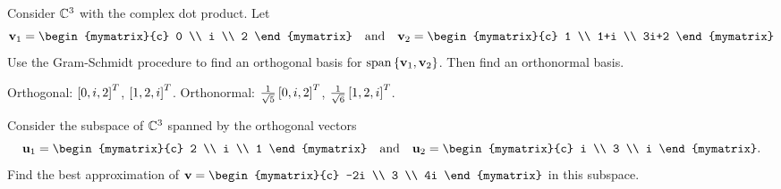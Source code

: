 \begin{ex}
  Consider $\mathbb{C}^3$ with the complex dot product. Let
  \begin{equation*}
    \vect{v}_1 = \begin{mymatrix}{c} 0 \\ i \\ 2 \end{mymatrix}
    \quad\mbox{and}\quad
    \vect{v}_2 = \begin{mymatrix}{c} 1 \\ 1+i \\ 3i+2  \end{mymatrix}
  \end{equation*}
  Use the Gram-Schmidt procedure to find an orthogonal basis for
  $\sspan\set{\vect{v}_1,\vect{v}_2}$. Then find an orthonormal basis.
  \begin{sol}
    Orthogonal: $\left[0,i,2\right]^T$, $\left[1,2,i\right]^T$. Orthonormal:
    $\frac{1}{\sqrt{5}}\left[0,i,2\right]^T$, $\frac{1}{\sqrt{6}}\left[1,2,i\right]^T$.
  \end{sol}
\end{ex}

\begin{ex}
  Consider the subspace of $\mathbb{C}^3$ spanned by the orthogonal vectors
  \begin{equation*}
    \vect{u}_1 = \begin{mymatrix}{c} 2 \\ i \\ 1 \end{mymatrix}
    \quad\mbox{and}\quad
    \vect{u}_2 = \begin{mymatrix}{c} i \\ 3 \\ i \end{mymatrix}.
  \end{equation*}
  Find the best approximation of
  $\vect{v}=\begin{mymatrix}{c} -2i \\ 3 \\ 4i \end{mymatrix}$ in this
  subspace.
\end{ex}
